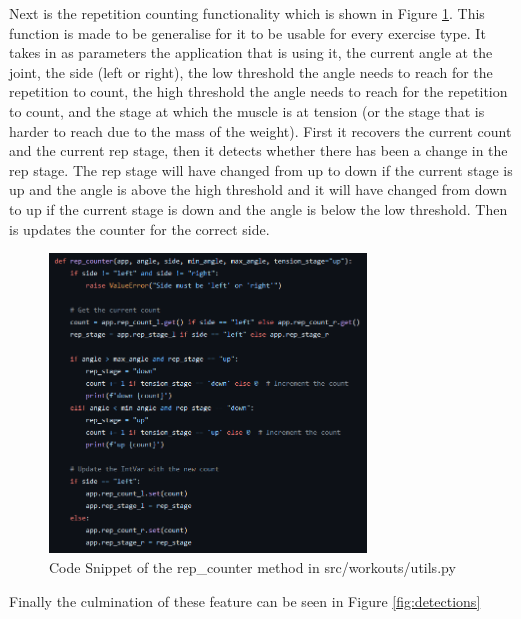     Next is the repetition counting functionality which is shown in Figure \ref{fig:rep_counter}. This function is made to be generalise for it to be usable for every exercise type. It takes in as parameters the application that is using it, the current angle at the joint, the side (left or right), the low threshold the angle needs to reach for the repetition to count, the high threshold the angle needs to reach for the repetition to count, and the stage at which the muscle is at tension (or the stage that is harder to reach due to the mass of the weight). First it recovers the current count and the current rep stage, then it detects whether there has been a change in the rep stage. The rep stage will have changed from up to down if the current stage is up and the angle is above the high threshold and it will have changed from down to up if the current stage is down and the angle is below the low threshold. Then is updates the counter for the correct side.

    \begin{figure}[htbp]
            \centering
            \includegraphics[width=0.75\textwidth]{figures/rep_counter.png}
            \caption{Code Snippet of the rep\_counter method in src/workouts/utils.py}
            \label{fig:rep_counter}
    \end{figure}
    
    Finally the culmination of these feature can be seen in Figure \ref{fig:detections}
    
